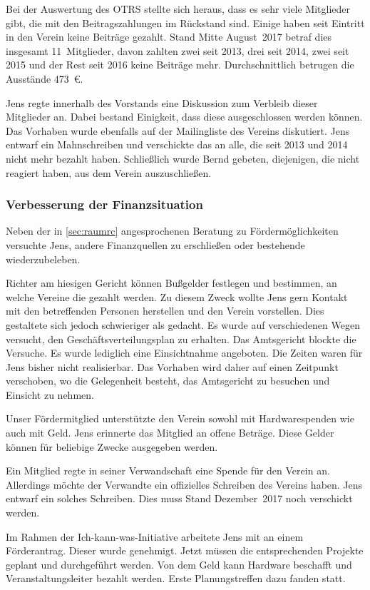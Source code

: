 \documentclass[ngerman]{scrartcl}
\begin{document}
Bei der Auswertung des OTRS stellte sich heraus, dass es sehr viele Mitglieder
gibt, die mit den Beitragszahlungen im Rückstand sind. Einige haben seit
Eintritt in den Verein keine Beiträge gezahlt. Stand Mitte August~2017 betraf
dies insgesamt 11~Mitglieder, davon zahlten zwei seit 2013, drei seit 2014, zwei
seit 2015 und der Rest seit 2016 keine Beiträge mehr. Durchschnittlich betrugen
die Ausstände \num{473}~\euro{}.

Jens regte innerhalb des
Vorstands eine Diskussion zum Verbleib dieser Mitglieder an. Dabei bestand
Einigkeit, dass diese ausgeschlossen werden können. Das Vorhaben wurde ebenfalls
auf der Mailingliste des Vereins diskutiert. Jens entwarf ein Mahnschreiben und
verschickte das an alle, die seit 2013 und 2014 nicht mehr bezahlt
haben. Schließlich wurde Bernd gebeten, diejenigen, die nicht reagiert haben,
aus dem Verein auszuschließen.

\subsubsection{Verbesserung der Finanzsituation}

Neben der in \autoref{sec:raumrc} angesprochenen Beratung zu Fördermöglichkeiten
versuchte Jens, andere Finanzquellen zu erschließen oder bestehende
wiederzubeleben.

Richter am hiesigen Gericht können Bußgelder festlegen und bestimmen, an welche
Vereine die gezahlt werden. Zu diesem Zweck wollte Jens gern Kontakt mit den
betreffenden Personen herstellen und den Verein vorstellen. Dies gestaltete sich
jedoch schwieriger als gedacht. Es wurde auf verschiedenen Wegen versucht, den
Geschäftsverteilungsplan zu erhalten. Das Amtsgericht blockte die Versuche. Es
wurde lediglich eine Einsichtnahme angeboten. Die Zeiten waren für Jens bisher
nicht realisierbar. Das Vorhaben wird daher auf einen Zeitpunkt verschoben, wo
die Gelegenheit besteht, das Amtsgericht zu besuchen und Einsicht zu nehmen.

Unser Fördermitglied unterstützte den Verein sowohl mit Hardwarespenden wie auch
mit Geld. Jens erinnerte das Mitglied an offene Beträge. Diese Gelder können für
beliebige Zwecke ausgegeben werden.

Ein Mitglied regte in seiner Verwandschaft eine Spende für den Verein
an. Allerdings möchte der Verwandte ein offizielles Schreiben des Vereins
haben. Jens entwarf ein solches Schreiben. Dies muss Stand Dezember~2017 noch
verschickt werden.

Im Rahmen der Ich-kann-was-Initiative arbeitete Jens mit an einem
Förderantrag. Dieser wurde genehmigt. Jetzt müssen die entsprechenden Projekte
geplant und durchgeführt werden. Von dem Geld kann Hardware beschafft und
Veranstaltungsleiter bezahlt werden. Erste Planungstreffen dazu fanden statt.
\end{document}
